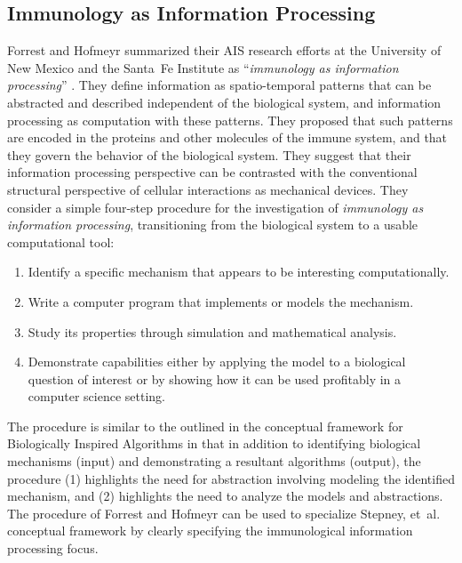 \documentclass[a4paper, 11pt]{article}
\begin{document}
% 
% 
\subsection{Immunology as Information Processing}
Forrest and Hofmeyr summarized their AIS research efforts at the University of New Mexico and the Santa~Fe Institute as ``\emph{immunology as information processing}'' \cite{Forrest2001}. They define information as spatio-temporal patterns that can be abstracted and described independent of the biological system, and information processing as computation with these patterns. They proposed that such patterns are encoded in the proteins and other molecules of the immune system, and that they govern the behavior of the biological system. They suggest that their information processing perspective can be contrasted with the conventional structural perspective of cellular interactions as mechanical devices. They consider a simple four-step procedure for the investigation of \emph{immunology as information processing}, transitioning from the biological system to a usable computational tool:

\begin{enumerate}
	\item Identify a specific mechanism that appears to be interesting computationally.
	\item Write a computer program that implements or models the mechanism.
	\item Study its properties through simulation and mathematical analysis.
	\item Demonstrate capabilities either by applying the model to a biological question of interest or by showing how it can be used profitably in a computer science setting.
\end{enumerate}

The procedure is similar to the outlined in the conceptual framework for Biologically Inspired Algorithms in that in addition to identifying biological mechanisms (input) and demonstrating a resultant algorithms (output), the procedure (1) highlights the need for abstraction involving modeling the identified mechanism, and (2) highlights the need to analyze the models and abstractions. The procedure of Forrest and Hofmeyr can be used to specialize Stepney, et~al. conceptual framework by clearly specifying the immunological information processing focus.


%
%
\end{document}
